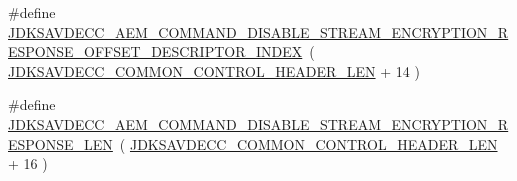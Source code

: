 \begin{DoxyCompactItemize}
\item 
\#define \hyperlink{group__command__disable__stream__encryption__response_ga722782e98289c186d22189c596971cf2}{J\+D\+K\+S\+A\+V\+D\+E\+C\+C\+\_\+\+A\+E\+M\+\_\+\+C\+O\+M\+M\+A\+N\+D\+\_\+\+D\+I\+S\+A\+B\+L\+E\+\_\+\+S\+T\+R\+E\+A\+M\+\_\+\+E\+N\+C\+R\+Y\+P\+T\+I\+O\+N\+\_\+\+R\+E\+S\+P\+O\+N\+S\+E\+\_\+\+O\+F\+F\+S\+E\+T\+\_\+\+D\+E\+S\+C\+R\+I\+P\+T\+O\+R\+\_\+\+I\+N\+D\+EX}~( \hyperlink{group__jdksavdecc__avtp__common__control__header_gaae84052886fb1bb42f3bc5f85b741dff}{J\+D\+K\+S\+A\+V\+D\+E\+C\+C\+\_\+\+C\+O\+M\+M\+O\+N\+\_\+\+C\+O\+N\+T\+R\+O\+L\+\_\+\+H\+E\+A\+D\+E\+R\+\_\+\+L\+EN} + 14 )
\item 
\#define \hyperlink{group__command__disable__stream__encryption__response_gaf504a02072cd6345fccae3b1330fc376}{J\+D\+K\+S\+A\+V\+D\+E\+C\+C\+\_\+\+A\+E\+M\+\_\+\+C\+O\+M\+M\+A\+N\+D\+\_\+\+D\+I\+S\+A\+B\+L\+E\+\_\+\+S\+T\+R\+E\+A\+M\+\_\+\+E\+N\+C\+R\+Y\+P\+T\+I\+O\+N\+\_\+\+R\+E\+S\+P\+O\+N\+S\+E\+\_\+\+L\+EN}~( \hyperlink{group__jdksavdecc__avtp__common__control__header_gaae84052886fb1bb42f3bc5f85b741dff}{J\+D\+K\+S\+A\+V\+D\+E\+C\+C\+\_\+\+C\+O\+M\+M\+O\+N\+\_\+\+C\+O\+N\+T\+R\+O\+L\+\_\+\+H\+E\+A\+D\+E\+R\+\_\+\+L\+EN} + 16 )
\end{DoxyCompactItemize}

